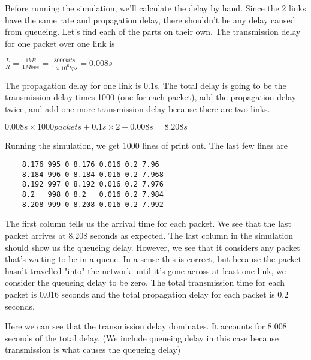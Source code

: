 \documentclass[11pt]{article}
\begin{document}
\vspace{5mm}

Before running the simulation, we'll calculate the delay by hand. Since the 2 links have the same rate and propagation delay, there shouldn't be any delay caused from queueing. Let's find each of the parts on their own. The transmission delay for one packet over one link is

\vspace{5mm}

\(\frac{L}{R} = \frac{1kB}{1Mbps} = \frac{8000bits}{1\times10^6 bps} = 0.008s\)

\vspace{5mm}

The propagation delay for one link is 0.1s. The total delay is going to be the transmission delay times 1000 (one for each packet), add the propagation delay twice, and add one more transmission delay because there are two links.

\vspace{5mm}

\(0.008s\times1000packets + 0.1s\times2 + 0.008s = 8.208s\)

\vspace{5mm}

Running the simulation, we get 1000 lines of print out. The last few lines are

\vspace{5mm}

\begin{lstlisting}
    8.176 995 0 8.176 0.016 0.2 7.96
    8.184 996 0 8.184 0.016 0.2 7.968
    8.192 997 0 8.192 0.016 0.2 7.976
    8.2   998 0 8.2   0.016 0.2 7.984
    8.208 999 0 8.208 0.016 0.2 7.992
\end{lstlisting}

\vspace{5mm}

The first column tells us the arrival time for each packet. We see that the last packet arrives at 8.208 seconds as expected. The last column in the simulation should show us the queueing delay. However, we see that it considers any packet that's waiting to be in a queue. In a sense this is correct, but because the packet hasn't travelled "into" the network until it's gone across at least one link, we consider the queueing delay to be zero. The total transmission time for each packet is 0.016 seconds and the total propagation delay for each packet is 0.2 seconds.

Here we can see that the transmission delay dominates. It accounts for 8.008 seconds of the total delay. (We include queueing delay in this case because transmission is what causes the queueing delay)
\end{document}
